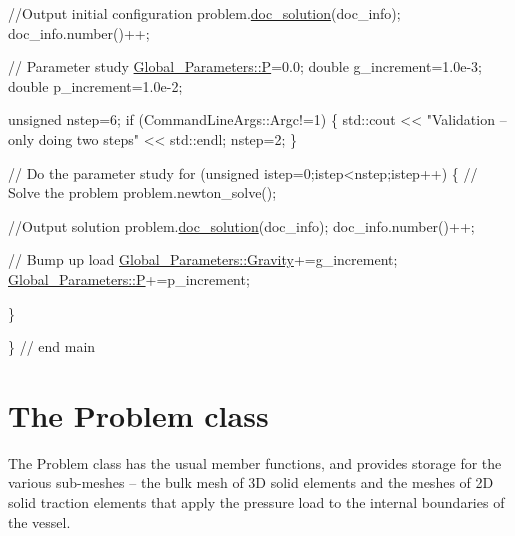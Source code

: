 \begin{DoxyCodeInclude}
 
 \textcolor{comment}{//Output initial configuration}
 problem.\hyperlink{classUnstructuredSolidProblem_ab3d66fd61b69d12b4f159d763fc44f15}{doc\_solution}(doc\_info);
 doc\_info.number()++;   

  \textcolor{comment}{// Parameter study}
 \hyperlink{namespaceGlobal__Parameters_a31fb55c20db4aa0127aafa20f0d76731}{Global\_Parameters::P}=0.0; 
 \textcolor{keywordtype}{double} g\_increment=1.0e-3; 
 \textcolor{keywordtype}{double} p\_increment=1.0e-2; 

 \textcolor{keywordtype}{unsigned} nstep=6;
 \textcolor{keywordflow}{if} (CommandLineArgs::Argc!=1)
  \{
   std::cout << \textcolor{stringliteral}{"Validation -- only doing two steps"} << std::endl;
   nstep=2;
  \}
 
 \textcolor{comment}{// Do the parameter study}
 \textcolor{keywordflow}{for} (\textcolor{keywordtype}{unsigned} istep=0;istep<nstep;istep++)
  \{
   \textcolor{comment}{// Solve the problem}
   problem.newton\_solve();
   
   \textcolor{comment}{//Output solution}
   problem.\hyperlink{classUnstructuredSolidProblem_ab3d66fd61b69d12b4f159d763fc44f15}{doc\_solution}(doc\_info);
   doc\_info.number()++;

   \textcolor{comment}{// Bump up load}
   \hyperlink{namespaceGlobal__Parameters_a335000b5db4206486a116ae0468d2d0c}{Global\_Parameters::Gravity}+=g\_increment;
   \hyperlink{namespaceGlobal__Parameters_a31fb55c20db4aa0127aafa20f0d76731}{Global\_Parameters::P}+=p\_increment; 
   
  \}
 
\} \textcolor{comment}{// end main}

\end{DoxyCodeInclude}




 

\hypertarget{index_class}{}\section{The Problem class}\label{index_class}
The {\ttfamily Problem} class has the usual member functions, and provides storage for the various sub-\/meshes -- the bulk mesh of 3D solid elements and the meshes of 2D solid traction elements that apply the pressure load to the internal boundaries of the vessel.


